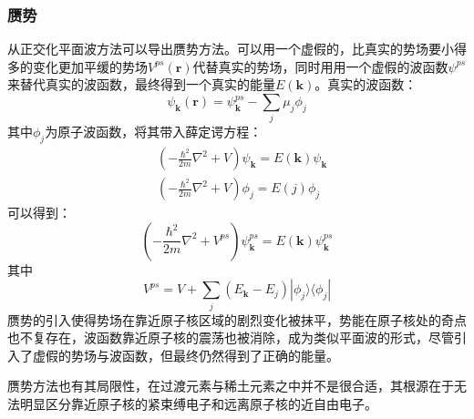\subsubsection{赝势}
从正交化平面波方法可以导出赝势方法。可以用一个虚假的，比真实的势场要小得多的变化更加平缓的势场$V^{ps}(\bm{r})$代替真实的势场，同时用用一个虚假的波函数$\psi^{ps}$来替代真实的波函数，最终得到一个真实的能量$E(\bm{k})$。真实的波函数：
\begin{equation}
    \psi_{\bm{k}}(\bm{r})=\psi_{\bm{k}}^{ps}-\sum_{j}\mu_{j}\phi_{j}
\end{equation}
其中$\phi_{j}$为原子波函数，将其带入薛定谔方程：
\begin{equation}
    \begin{split}
        &(-\frac{\hbar^{2}}{2m}\nabla^{2}+V)\psi_{\bm{k}}=E(\bm{k})\psi_{\bm{k}} \\
        &(-\frac{\hbar^{2}}{2m}\nabla^{2}+V)\phi_{j}=E(j)\phi_{j}
    \end{split}
\end{equation}
可以得到：
\begin{equation}
    (-\frac{\hbar^{2}}{2m}\nabla^{2}+V^{ps})\psi^{ps}_{\bm{k}}=E(\bm{k})\psi^{ps}_{\bm{k}}
\end{equation}
其中
\begin{equation}
    V^{ps}=V+\sum_{j}(E_{\bm{k}}-E_{j})|\phi_{j}\rangle\langle\phi_{j}|
\end{equation}
赝势的引入使得势场在靠近原子核区域的剧烈变化被抹平，势能在原子核处的奇点也不复存在，波函数靠近原子核的震荡也被消除，成为类似平面波的形式，尽管引入了虚假的势场与波函数，但最终仍然得到了正确的能量。

赝势方法也有其局限性，在过渡元素与稀土元素之中并不是很合适，其根源在于无法明显区分靠近原子核的紧束缚电子和远离原子核的近自由电子。

